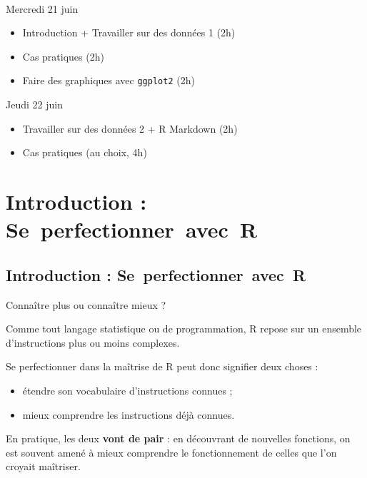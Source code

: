 \documentclass[12pt,handout,ignorenonframetext,]{beamer}
\providecommand{\tightlist}{%
\setlength{\itemsep}{0pt}\setlength{\parskip}{0pt}}
\begin{document}
\begin{frame}[fragile]{~}

\large

Mercredi 21 juin

\begin{itemize}
\tightlist
\item
  Introduction + Travailler sur des données 1 (2h)
\item
  Cas pratiques (2h)
\item
  Faire des graphiques avec \texttt{ggplot2} (2h)
\end{itemize}

\pause Jeudi 22 juin

\begin{itemize}
\tightlist
\item
  Travailler sur des données 2 + R Markdown (2h)
\item
  Cas pratiques (au choix, 4h)
\end{itemize}

\end{frame}

\section{Introduction :
Se~perfectionner~avec~R}\label{introduction-seperfectionneravecr}

\subsection*{Introduction : Se\ perfectionner\ avec\ R}

\begin{frame}{Connaître plus ou connaître mieux ?}

Comme tout langage statistique ou de programmation, R repose sur un
ensemble d'instructions plus ou moins complexes.

\pause \bigskip
Se perfectionner dans la maîtrise de R peut donc signifier deux choses :

\begin{itemize}
\tightlist
\item
  étendre son \og vocabulaire \fg{} d'instructions connues ;
\item
  mieux comprendre les instructions déjà connues.
\end{itemize}

\pause \bigskip
En pratique, les deux \textbf{vont de pair} : en découvrant de nouvelles
fonctions, on est souvent amené à mieux comprendre le fonctionnement de
celles que l'on croyait maîtriser.

\end{frame}
\end{document}
